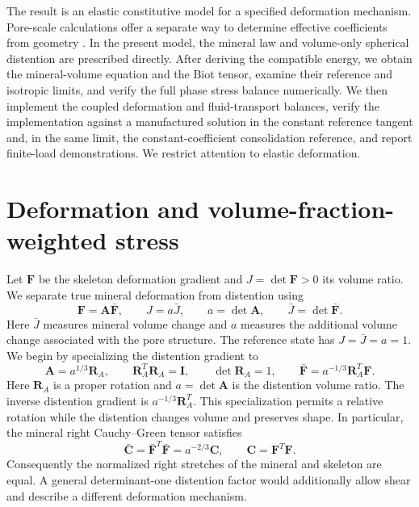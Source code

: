 \documentclass[11pt]{article}
\begin{document}
The result is an elastic constitutive model for a specified deformation
mechanism. Pore-scale calculations offer a separate way to determine
effective coefficients from geometry \citep{dehghanipentamerodio2019,
dehghanizilian2021}. In the present model, the mineral law and volume-only spherical
distention are prescribed directly. After deriving the compatible energy,
we obtain the mineral-volume equation and the Biot tensor, examine their
reference and isotropic limits, and verify the full phase stress balance
numerically. We then implement the coupled deformation and fluid-transport
balances, verify the implementation against a manufactured solution in the
constant reference tangent and, in the same limit, the constant-coefficient
consolidation reference, and report finite-load demonstrations. We restrict attention to elastic
deformation.

\section{Deformation and volume-fraction-weighted stress}
\label{sec:kinematics}

Let \(\mathbf F\) be the skeleton deformation gradient and
\(J=\det\mathbf F>0\) its volume ratio. We separate true mineral
deformation from distention using \citep{drumheller2000}
\begin{equation}
 \mathbf F=\mathbf A\bar{\mathbf F},\qquad
 J=a\bar J,\qquad
 a=\det\mathbf A,\qquad \bar J=\det\bar{\mathbf F}.
 \label{eq:true-mineral-jacobian}
\end{equation}
Here \(\bar J\) measures mineral volume change and \(a\) measures the
additional volume change associated with the pore structure. The reference
state has \(J=\bar J=a=1\). We begin by specializing the distention gradient to
\begin{equation}
 \mathbf A=a^{1/3}\mathbf R_A,\qquad
 \mathbf R_A^T\mathbf R_A=\mathbf I,\qquad \det\mathbf R_A=1,\qquad
 \bar{\mathbf F}=a^{-1/3}\mathbf R_A^T\mathbf F.
 \label{eq:spherical-distention}
\end{equation}
Here \(\mathbf R_A\) is a proper rotation and \(a=\det\mathbf A\) is the
distention volume ratio. The inverse distention gradient is
\(a^{-1/3}\mathbf R_A^T\). This specialization permits a relative rotation
while the distention changes volume and preserves shape.
In particular, the mineral right Cauchy--Green tensor satisfies
\begin{equation}
 \bar{\mathbf C}=\bar{\mathbf F}^T\bar{\mathbf F}
                  =a^{-2/3}\mathbf C,\qquad
 \mathbf C=\mathbf F^T\mathbf F.
 \label{eq:spherical-mineral-metric}
\end{equation}
Consequently the normalized right stretches of the mineral and skeleton
are equal. A general determinant-one distention factor would additionally allow
shear and describe a different deformation mechanism.
\end{document}
